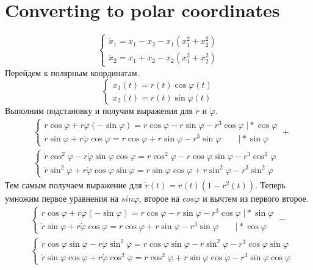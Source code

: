 \documentclass[12pt]{article}
\begin{document}
\section*{Converting to polar coordinates}
\begin{equation}
\begin{cases}
  \dot{x}_1=x_1-x_2-x_1(x_1^2+x_2^2)\\
  \dot{x}_2=x_1+x_2-x_2(x_1^2+x_2^2)
\end{cases}
\end{equation}
Перейдем к полярным координатам.
\begin{equation}
  \begin{cases}
    x_1(t)=r(t)\cos{\varphi(t)}\\
    x_2(t)=r(t)\sin{\varphi(t)}
  \end{cases}
\end{equation}
Выполним подстановку и получим выражения для $\dot{r}$ и $\dot{\varphi}$.
\begin{align}
  &\begin{cases}
    \dot{r}\cos{\varphi}+r\dot{\varphi}(-\sin{\varphi})=r\cos{\varphi}-r\sin{\varphi}-r^3\cos{\varphi}\;\big|*\cos{\varphi}\\
    \dot{r}\sin{\varphi}+r\dot{\varphi}\cos{\varphi}=r\cos{\varphi}+r\sin{\varphi}-r^3\sin{\varphi}\quad\quad\big|*\sin{\varphi}
  \end{cases}+\\
  &\begin{cases}
    \dot{r}\cos^2{\varphi}-r\dot{\varphi}\sin{\varphi}\cos{\varphi}=
    r\cos^2{\varphi}-r\cos{\varphi}\sin{\varphi}-r^3\cos^2{\varphi}\\
    \dot{r}\sin^2{\varphi}+r\dot{\varphi}\cos{\varphi}\sin{\varphi}=
    r\sin{\varphi}\cos{\varphi}+r\sin^2{\varphi}-r^3\sin^2{\varphi}
  \end{cases}
\end{align}
Тем самым получаем выражение для $\dot{r}(t)=r(t)(1-r^2(t))$. Теперь умножим первое уравнения на $sin{\varphi}$,
второе на $cos{\varphi}$ и вычтем из первого второе.
\begin{align}
  &\begin{cases}
    \dot{r}\cos{\varphi}+r\dot{\varphi}(-\sin{\varphi})=r\cos{\varphi}-r\sin{\varphi}-r^3\cos{\varphi}\;\big|*\sin{\varphi}\\
    \dot{r}\sin{\varphi}+r\dot{\varphi}\cos{\varphi}=r\cos{\varphi}+r\sin{\varphi}-r^3\sin{\varphi}\quad\quad\big|*\cos{\varphi}
  \end{cases}-\\
  &\begin{cases}
    \dot{r}\cos{\varphi}\sin{\varphi}-r\dot{\varphi}\sin^2{\varphi}=
    r\cos{\varphi}\sin{\varphi}-r\sin^2{\varphi}-r^3\cos{\varphi}\sin{\varphi}\\
    \dot{r}\sin{\varphi}\cos{\varphi}+r\dot{\varphi}\cos^2{\varphi}=
    r\cos^2{\varphi}+r\sin{\varphi}\cos{\varphi}-r^3\sin{\varphi}\cos{\varphi}
  \end{cases}
\end{align}
\end{document}
